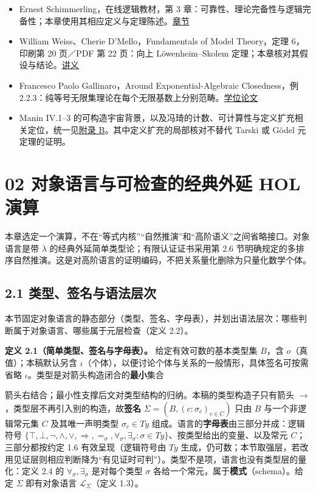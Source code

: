 \documentclass[UTF8,a4paper,zihao=-4,fontset=windows,openany]{ctexbook}
\newcommand{\mcsorigin}[1]{\par\noindent{\small\color{black!55}#1}\par\addvspace{0.8em}}
\newcommand{\mcsdisplay}[1]{%
  \par\addvspace{0.7em}%
  \sbox{\mcsmathbox}{\ensuremath{\displaystyle #1}}%
  \ifdim\wd\mcsmathbox>\linewidth
    \noindent\resizebox{\linewidth}{!}{\usebox{\mcsmathbox}}%
  \else
    \noindent\hspace*{\fill}\usebox{\mcsmathbox}\hspace*{\fill}%
  \fi
  \par\addvspace{0.7em}%
}
\def\ensuremath#1{#1}%
\def\mathrm#1{#1}%
\begin{document}
\begin{itemize}
\item Ernest Schimmerling，在线逻辑教材，第 3 章：可靠性、理论完备性与逻辑完备性；本章使用其相应定义与定理陈述。\href{https://www.math.cmu.edu/\textasciitilde{}eschimme/300Book/300-Page-3.html}{章节}
\item William Weiss、Cherie D’Mello，Fundamentals of Model Theory，定理 6，印刷第 20 页／PDF 第 22 页：向上 Löwenheim–Skolem 定理；本章核对其假设与结论。\href{https://people.math.sc.edu/mcnulty/modeltheory/WeissDMello.pdf}{讲义}
\item Francesco Paolo Gallinaro，Around Exponential-Algebraic Closedness，例 2.2.3：纯等号无限集理论在每个无限基数上分别范畴。\href{https://etheses.whiterose.ac.uk/id/eprint/31077/1/Gallinaro\_FP\_Mathematics\_PhD\_2022.pdf}{学位论文}
\item Manin IV.1–3 的可构造宇宙背景，以及冯琦的计数、可计算性与定义扩充相关定位，统一见\hyperref[mcs-source-25]{附录 B}。其中定义扩充的局部核对不替代 Tarski 或 Gödel 元定理的证明。
\end{itemize}
\clearpage\chapter{02 对象语言与可检查的经典外延 HOL 演算}
\label{mcs-source-4}
\mcsorigin{原章节：02-对象语言：简单类型论.md}
本章选定一个演算，不在“等式内核”“自然推演”和“高阶语义”之间省略接口。对象语言是带 \(\lambda\) 的经典外延简单类型论；有限认证证书采用第 2.6 节明确规定的多排序自然推演。这是对高阶语言的证明编码，不把关系量化删除为只量化数学个体。

\section{2.1 类型、签名与语法层次}
本节固定对象语言的静态部分（类型、签名、字母表），并划出语法层次：哪些判断属于对象语言、哪些属于元层检查（定义 2.2）。

\textbf{定义 2.1（简单类型、签名与字母表）。} 给定有效可数的基本类型集 \(B\)，含 \(o\)（真值）；本稿默认另含 \(\iota\)（个体），以便讨论个体与关系的一般情形，具体签名可按需省略 \(\iota\)。类型是对箭头构造闭合的\textbf{最小}集合


\mcsdisplay{\mathrm{Ty}=B\cup\{\sigma\to\tau:\sigma,\tau\in\mathrm{Ty}\}.}
\noindent 箭头右结合；最小性支撑后文对类型结构的归纳。本稿的类型构造子只有箭头 \(\to\)，类型层不再引入别的构造，故\textbf{签名} \(\Sigma=(B,(c:\sigma_c)_{c\in C})\) 只由 \(B\) 与一个非逻辑常元集 \(C\) 及其唯一声明类型 \(\sigma_c\in\mathrm{Ty}\) 组成。语言的\textbf{字母表}由三部分并成：逻辑符号 \(\{\top,\bot,\neg,\wedge,\vee,\Rightarrow,=_\sigma,\forall_\sigma,\exists_\sigma:\sigma\in\mathrm{Ty}\}\)、按类型给出的变量、以及常元 \(C\)；三部分都按约定 1.6 有效呈现（逻辑符号由 \(\mathrm{Ty}\) 生成，仍可数；本节取强层，若改用见证层则相应判断降为“有见证时可判”）。类型不是项，语言也没有类型层的量化：定义 2.4 的 \(\forall_\sigma,\exists_\sigma\) 是对每个类型 \(\sigma\) 各给一个常元，属于\textbf{模式}（schema）。给定 \(\Sigma\) 即有对象语言 \(\mathcal L_\Sigma\)（定义 1.3）。
\end{document}
